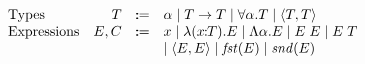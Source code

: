 \[
\begin{array}{lrrl}
  \text{Types} & T & \dcoloneq &
    \alpha
    \mid T \to T
    \mid \forall \alpha. T
    \mid \langle T, T \rangle \\

  \text{Expressions} & E, C & \dcoloneq &
    x
    \mid \abs{\rel{x}{T}}{E}
    \mid \Abs{\alpha}{E}
    \mid \app{E}{E}
    \mid \app{E}{T} \\ & & &
    \mid \langle E, E \rangle
    \mid \meta{fst} E
    \mid \meta{snd} E
\end{array}
\]
